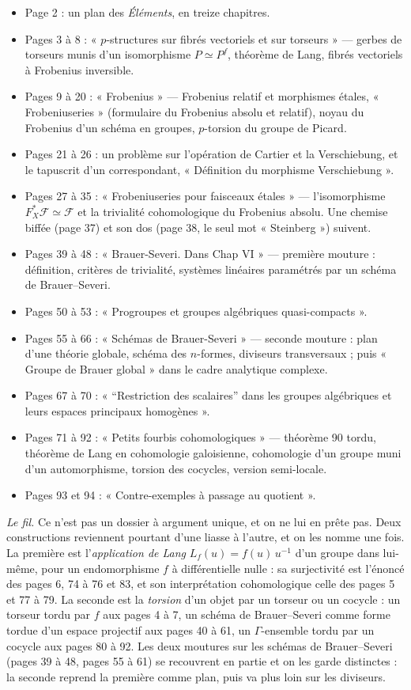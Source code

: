 \documentclass[11pt,a4paper]{article}
\begin{document}
\begin{itemize}
\item Page 2 : un plan des \emph{Éléments}, en treize chapitres.
\item Pages 3 à 8 : « $p$-structures sur fibrés vectoriels et sur torseurs » —
gerbes de torseurs munis d'un isomorphisme $P \simeq P^{f}$, théorème de Lang,
fibrés vectoriels à Frobenius inversible.
\item Pages 9 à 20 : « Frobenius » — Frobenius relatif et morphismes étales,
« Frobeniuseries » (formulaire du Frobenius absolu et relatif), noyau du
Frobenius d'un schéma en groupes, $p$-torsion du groupe de Picard.
\item Pages 21 à 26 : un problème sur l'opération de Cartier et la
Verschiebung, et le tapuscrit d'un correspondant, « Définition du morphisme
Verschiebung ».
\item Pages 27 à 35 : « Frobeniuseries pour faisceaux étales » — l'isomorphisme
$F_X^{*}\mathcal{F} \simeq \mathcal{F}$ et la trivialité cohomologique du
Frobenius absolu. Une chemise biffée (page 37) et son dos (page 38, le seul mot
« Steinberg ») suivent.
\item Pages 39 à 48 : « Brauer-Severi. Dans Chap VI » — première mouture :
définition, critères de trivialité, systèmes linéaires paramétrés par un
schéma de Brauer–Severi.
\item Pages 50 à 53 : « Progroupes et groupes algébriques quasi-compacts ».
\item Pages 55 à 66 : « Schémas de Brauer-Severi » — seconde mouture : plan
d'une théorie globale, schéma des $n$-formes, diviseurs transversaux ; puis
« Groupe de Brauer global » dans le cadre analytique complexe.
\item Pages 67 à 70 : « “Restriction des scalaires” dans les groupes
algébriques et leurs espaces principaux homogènes ».
\item Pages 71 à 92 : « Petits fourbis cohomologiques » — théorème 90 tordu,
théorème de Lang en cohomologie galoisienne, cohomologie d'un groupe muni
d'un automorphisme, torsion des cocycles, version semi-locale.
\item Pages 93 et 94 : « Contre-exemples à passage au quotient ».
\end{itemize}

\emph{Le fil.} Ce n'est pas un dossier à argument unique, et on ne lui en
prête pas. Deux constructions reviennent pourtant d'une liasse à l'autre, et
on les nomme une fois. La première est l'\emph{application de Lang}
$L_f(u) = f(u)\,u^{-1}$ d'un groupe dans lui-même, pour un endomorphisme $f$
à différentielle nulle : sa surjectivité est l'énoncé des pages 6, 74 à 76
et 83, et son interprétation cohomologique celle des pages 5 et 77 à 79. La
seconde est la \emph{torsion} d'un objet par un torseur ou un cocycle : un
torseur tordu par $f$ aux pages 4 à 7, un schéma de Brauer–Severi comme forme
tordue d'un espace projectif aux pages 40 à 61, un $\Gamma$-ensemble tordu par
un cocycle aux pages 80 à 92. Les deux moutures sur les schémas de
Brauer–Severi (pages 39 à 48, pages 55 à 61) se recouvrent en partie et on les
garde distinctes : la seconde reprend la première comme plan, puis va plus
loin sur les diviseurs.
\end{document}
